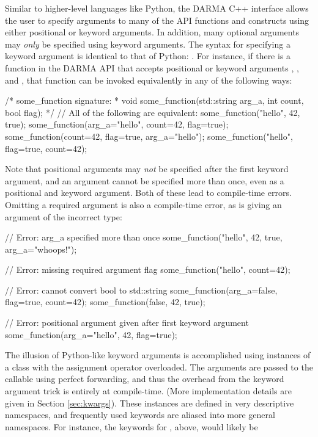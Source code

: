 Similar to higher-level languages like Python, the DARMA C++ interface allows the user
to specify arguments to many of the API functions and constructs using either positional
or keyword arguments. In addition, many optional arguments may {\em only} be specified using
keyword arguments. The syntax for specifying a keyword argument is identical to that
of Python: .  For instance, if there is 
a function  in the DARMA API that accepts 
positional or keyword arguments , 
, and , that function can be invoked 
equivalently in any of the following ways:
\begin{CppCode}
/* some_function signature:
 *  void some_function(std::string arg_a, int count, bool flag);
 */
// All of the following are equivalent:
some_function("hello", 42, true);
some_function(arg_a="hello", count=42, flag=true);
some_function(count=42, flag=true, arg_a="hello");
some_function("hello", flag=true, count=42);
\end{CppCode}
Note that positional arguments may {\em not} be specified after the first keyword argument,
and an argument cannot be specified more than once, even as a positional and keyword
argument.  Both of these lead to compile-time errors. Omitting a required argument is 
also a compile-time error, as is giving an argument of the incorrect type: 
\begin{CppCode}
// Error: arg_a specified more than once
some_function("hello", 42, true, arg_a="whoops!");

// Error: missing required argument flag
some_function("hello", count=42);

// Error: cannot convert bool to std::string
some_function(arg_a=false, flag=true, count=42);
some_function(false, 42, true);

// Error: positional argument given after first keyword argument
some_function(arg_a="hello", 42, flag=true);
\end{CppCode}
The illusion of Python-like keyword arguments is accomplished 
using  instances
of a class with the assignment operator overloaded.  The arguments are passed to the 
callable using perfect forwarding, and thus the overhead from the keyword argument 
trick is entirely at compile-time.  (More implementation details are given in
Section \ref{sec:kwargs}).  These instances are defined in very descriptive namespaces,
and frequently used keywords are aliased into more general namespaces. 
For instance, the keywords for , above, would likely be 
